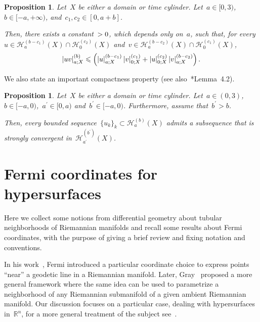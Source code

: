 \documentclass[12pt,a4paper]{amsart}
\makeatletter
\numberwithin{equation}{section}
\newtheorem{proposition}[theorem]{Proposition}
\theoremstyle{definition}
\theoremstyle{remark}
\newcommand{\R}{\mathbb{R}}
\newcommand{\abs}[1]{\left\lvert#1\right\rvert}
\renewcommand{\leq}{\leqslant}
\newcommand{\constapp}[1]{%
  \csname constapp@#1\endcsname%
}
\makeatother
\begin{document}
\begin{appendix}
\begin{proposition}\label{PROP::HolderProductRule}
    Let~$X$ be either a domain or time cylinder. Let~$a \in [0,3)$,~$b \in [-a,+\infty)$, and~$c_1,c_2 \in  [0,a+b]$. %
    
    Then, there exists a constant~$\constapp{CONST::HolderProductRule} > 0$, which depends only on~$a$, such that, for every~$u \in \mathcal{H}_a^{(b-c_1)}(X)\cap\mathcal{H}_0^{(c_2)}(X)$ and~$v \in \mathcal{H}_a^{(b-c_2)}(X)\cap\mathcal{H}_0^{(c_1)}(X)$,
    \begin{equation}
        \abs{uv}_{a; X}^{(b)} \leq \constapp{CONST::HolderProductRule} \left(\abs{u}_{a; X}^{(b-c_1)}\abs{v}_{0; X}^{(c_1)} + \abs{u}_{0; X}^{(c_2)}\abs{v}_{a; X}^{(b-c_2)}\right) .
    \end{equation}
\end{proposition}

We also state an important compactness property (see also~\cite{MR588031}*{Lemma~4.2}).
\begin{proposition}\label{PROP::HolderCompactEmbedding}
    Let~$X$ be either a domain or time cylinder. Let~$a \in (0,3)$,~$b \in [-a,0)$,~$a^\prime \in [0,a)$ and~$b^\prime \in [-a,0)$. Furthermore, assume that~$b^\prime > b$.%

    Then, every bounded sequence~${\{u_k\}}_k \subset \mathcal{H}_a^{(b)}(X)$ admits a subsequence that is strongly convergent in~$\mathcal{H}_{a^\prime}^{(b^\prime)}(X)$.
\end{proposition}

\section{Fermi coordinates for hypersurfaces}\label{APP::FermiCoordinates}
Here we collect some notions from differential geometry about tubular neighborhoods of Riemannian manifolds and recall some results about Fermi coordinates, with the purpose of giving a brief review and fixing notation and conventions.

In his work~\cite{1922RendL..31...21F}, Fermi introduced a particular coordinate choice to express points ``near'' a geodetic line in a Riemannian manifold. Later, Gray~\cite{MR827265} proposed a more general framework where the same idea can be used to parametrize a neighborhood of any Riemannian submanifold of a given ambient Riemannian manifold. Our discussion focuses on a particular case, dealing with hypersurfaces in~$\R^n$, for a more general treatment of the subject see~\cite{MR2024928}.


\end{appendix}
\end{document}
